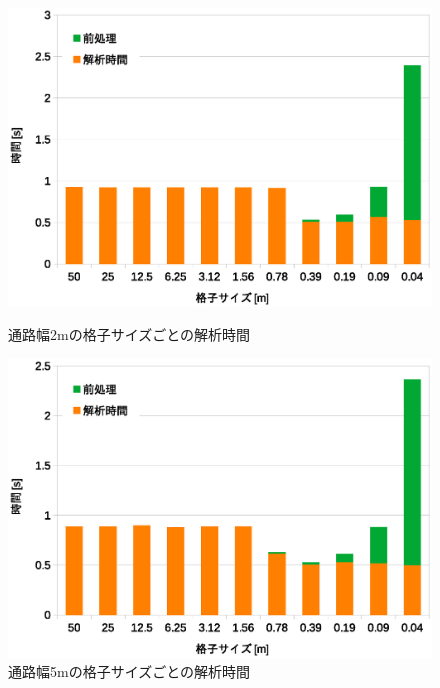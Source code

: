 \begin{figure}[tb]
	\begin{minipage}[b]{0.48\columnwidth}
		\begin{center}
		\includegraphics[width=\columnwidth]{figure/5_2m_jikan.eps}
		\caption{通路幅2mの格子サイズごとの解析時間}
		\label{fig:result_2m_jikan}
		\end{center}
	\end{minipage}
	\hspace{0.04\columnwidth}
	\begin{minipage}[b]{0.48\columnwidth}
		\begin{center}
		\includegraphics[width=\columnwidth]{figure/5_5m_jikan.eps}
		\caption{通路幅5mの格子サイズごとの解析時間}
		\label{fig:result_5m_jikan}
		\end{center}
	\end{minipage}
\end{figure}

